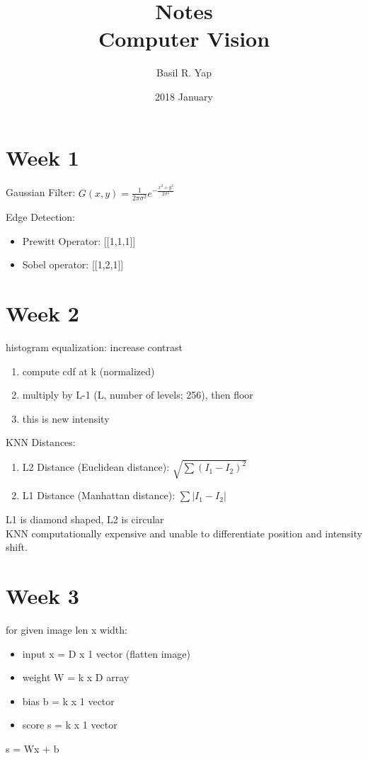 \documentclass[a4paper, fleqn]{article}
\begin{document}
\title{Notes \\ Computer Vision}
\author{Basil R. Yap}
\date{2018 January}
\maketitle

\section{Week 1}

Gaussian Filter: $G(x,y)=\frac{1}{2\pi\sigma^2}e^{-\frac{x^2+y^2}{2\sigma^2}}$

Edge Detection:\begin{itemize}
\item Prewitt Operator: [[1,1,1]]
\item Sobel operator: [[1,2,1]]
\end{itemize}

\section{Week 2}

histogram equalization: increase contrast
\begin{enumerate}
\item compute cdf at k (normalized)
\item multiply by L-1 (L, number of levels; 256), then floor
\item this is new intensity
\end{enumerate}

KNN Distances:
\begin{enumerate}
\item L2 Distance (Euclidean distance): $\sqrt{\sum(I_1-I_2)^2}$
\item L1 Distance (Manhattan distance): $\sum|I_1-I_2|$
\end{enumerate}
L1 is diamond shaped, L2 is circular\\

KNN computationally expensive and unable to differentiate position and intensity shift.

\section{Week 3}

for given image len x width:
\begin{itemize}
\item input x = D x 1 vector (flatten image)
\item weight W = k x D array
\item bias b = k x 1 vector
\item score s = k x 1 vector
\end{itemize}
s = Wx + b\\
\end{document}
